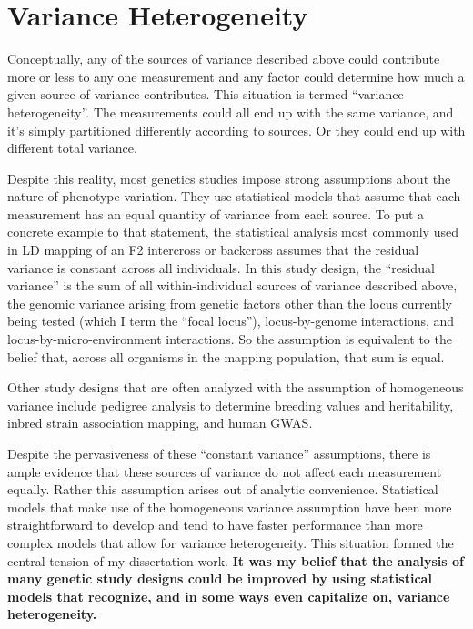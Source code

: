 \section{Variance Heterogeneity}

Conceptually, any of the sources of variance described above could contribute more or less to any one measurement and any factor could determine how much a given source of variance contributes.
This situation is termed ``variance heterogeneity''.
The measurements could all end up with the same variance, and it's simply partitioned differently according to sources.
Or they could end up with different total variance.

Despite this reality, most genetics studies impose strong assumptions about the nature of phenotype variation.
They use statistical models that assume that each measurement has an equal quantity of variance from each source.
To put a concrete example to that statement, the statistical analysis most commonly used in LD mapping of an F2 intercross or backcross assumes that the residual variance is constant across all individuals.
In this study design, the ``residual variance'' is the sum of all within-individual sources of variance described above, the genomic variance arising from genetic factors other than the locus currently being tested (which I term the ``focal locus''), locus-by-genome interactions, and locus-by-micro-environment interactions.
So the assumption is equivalent to the belief that, across all organisms in the mapping population, that sum is equal.

Other study designs that are often analyzed with the assumption of homogeneous variance include pedigree analysis to determine breeding values and heritability, inbred strain association mapping, and human GWAS.

Despite the pervasiveness of these ``constant variance'' assumptions, there is ample evidence that these sources of variance do not affect each measurement equally.
Rather this assumption arises out of analytic convenience.
Statistical models that make use of the homogeneous variance assumption have been more straightforward to develop and tend to have faster performance than more complex models that allow for variance heterogeneity.
This situation formed the central tension of my dissertation work.
\textbf{It was my belief that the analysis of many genetic study designs could be improved by using statistical models that recognize, and in some ways even capitalize on, variance heterogeneity.}

